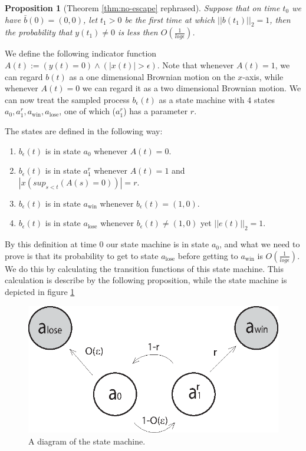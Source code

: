 \documentclass[11pt]{article}
\newtheorem{propos}{Proposition}
\begin{document}
{\begin{propos}[Theorem \ref{thm:no-escape} rephrased]\label{prop:reph}
Suppose that on time $t_0$ we have
$\bar{b}(0)=(0,0)$, let $t_1>0$ be the first time at which
$||b(t_1)||_2=1$, then the probability that $y(t_1)\neq0$ is less then
$O(\frac1{log\epsilon})$.
\end{propos}

We define the following indicator function
$A(t):=(y(t)=0)\wedge(|x(t)|>\epsilon)$. Note that whenever $A(t)=1$,
we can regard $b(t)$ as a one dimensional Brownian motion on the
$x$-axis, while whenever $A(t)=0$ we can regard it as a two
dimensional Brownian motion. We can now treat the sampled
process $b_\epsilon(t)$ as a state machine with $4$ states 
$a_0,a^r_1,a_{\text{win}},a_{\text{lose}}$, one of which ($a^r_1$) has a parameter $r$.

The states are defined in the following way: 
\begin{enumerate}
\item\label{n1} $b_\epsilon(t)$ is in state $a_0$ whenever $A(t)=0$. 
\item\label{n2} $b_\epsilon(t)$ is in state $a^r_1$ whenever $A(t)=1$ and $|x(sup_{s<t}(A(s)=0))|=r$. 
\item\label{n3} $b_\epsilon(t)$ is in state $a_\text{win}$ whenever $b_\epsilon(t)=(1,0)$. 
\item\label{n4} $b_\epsilon(t)$ is in state $a_\text{lose}$ whenever $b_\epsilon(t)\neq(1,0)$ yet $||e(t)||_2=1$.
\end{enumerate}

By this definition at time $0$ our state machine is in state $a_0$, 
and what we need to prove is that its probability to get to state $a_\text{lose}$ before
 getting to $a_\text{win}$ is $O(\frac1{log\epsilon})$. We do this by calculating the transition functions of 
 this state machine. This calculation is describe by the following proposition, while the state machine is depicted in figure \ref{fig:state_machine}

 \begin{figure}[htb]
\begin{center}
\leavevmode
\includegraphics{state_machine.eps}
\end{center}
\caption{A diagram of the state machine.}
\label{fig:state_machine}
\end{figure}

}
\end{document}
